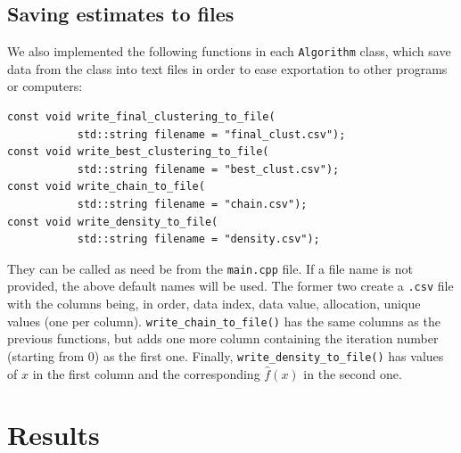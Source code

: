 \subsection{Saving estimates to files}
We also implemented the following functions in each \verb|Algorithm| class, which save data from the class into text files in order to ease exportation to other programs or computers:
\begin{verbatim}
const void write_final_clustering_to_file(
           std::string filename = "final_clust.csv");
const void write_best_clustering_to_file(
           std::string filename = "best_clust.csv");
const void write_chain_to_file(
           std::string filename = "chain.csv");
const void write_density_to_file(
           std::string filename = "density.csv");
\end{verbatim}
They can be called as need be from the \verb|main.cpp| file.
If a file name is not provided, the above default names will be used.
The former two create a \verb|.csv| file with the columns being, in order, data index, data value, allocation, unique values (one per column).
\verb|write_chain_to_file()| has the same columns as the previous functions, but adds one more column containing the iteration number (starting from $0$) as the first one.
Finally, \verb|write_density_to_file()| has values of $x$ in the first column and the corresponding $\hat f(x)$ in the second one.

\section{Results}
